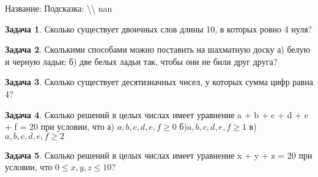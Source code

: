 \documentclass[a4paper,11pt]{article}%
\theoremstyle{definition}%
\newtheorem{Ex}{\hspace{-25pt}\fbox{\phantom{123}} Задача}%
\begin{document}
%
Название: \newline%
%
Подсказка: \textbackslash{}\textbackslash{}%
nan%
\fi%
%
\begin{Ex}%
Сколько существует двоичных слов длины 10, в которых ровно 4 нуля?%
%
\end{Ex}%
%
\iffalse%
Автор: Ираклий Гагуа\newline%
%
Дата: 07.01.2011\newline%
%
Название: \newline%
%
Подсказка: \textbackslash{}\textbackslash{}%
nan%
\fi%
%
\begin{Ex}%
Сколькими способами можно поставить на шахматную доску а) белую и
черную ладьи; б) две белых ладьи так, чтобы они не били друг друга?%
%
\end{Ex}%
%
\iffalse%
Автор: 25 школа\newline%
%
Дата: 01.11.2012\newline%
%
Название: \newline%
%
Подсказка: \textbackslash{}\textbackslash{}%
nan%
\fi%
%
\begin{Ex}%
Сколько существует десятизначных чисел, у которых сумма цифр равна 4?%
%
\end{Ex}%
%
\iffalse%
Автор: 25 школа\newline%
%
Дата: 01.07.2017\newline%
%
Название: \newline%
%
Подсказка: \textbackslash{}\textbackslash{}%
nan%
\fi%
%
\begin{Ex}%
Сколько решений в целых числах имеет уравнение a + b + c + d + e + f = 20 при
условии, что
а) $a, b, c, d, e, f \geq 0$ б)$a, b, c, d, e, f \geq 1$ в) $a, b, c, d, e, f \geq 2$%
%
\end{Ex}%
%
\iffalse%
Автор: Дмитрий Трущин\newline%
%
Дата: 01.10.2013\newline%
%
Название: \newline%
%
Подсказка: \textbackslash{}\textbackslash{}%
nan%
\fi%
%
\begin{Ex}%
Сколько решений в целых числах имеет уравнение x + y + z = 20 при условии,
что $0 \leq x, y, z \leq 10$?%
%
\end{Ex}%
%
\iffalse%
Автор: Дмитрий Трущин\newline%
%
Дата: 01.10.2013\newline%
%
Название: \newline%
%
Подсказка: \textbackslash{}\textbackslash{}%
nan%
\fi%
%
\end{document}
